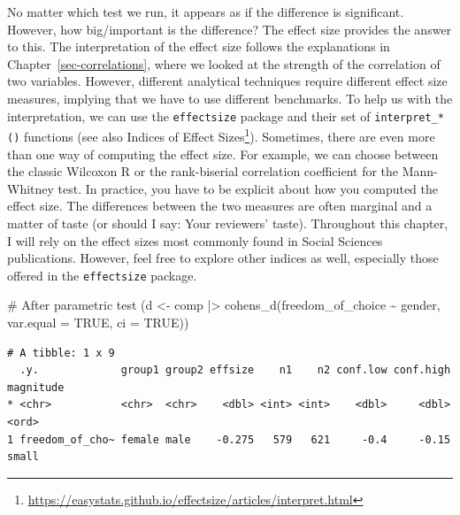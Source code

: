 \documentclass[
  letterpaper,
]{krantz}
\makeatletter
\newenvironment{Shaded}{\begin{snugshade}}{\end{snugshade}}
\newcommand{\AttributeTok}[1]{\textcolor[rgb]{0.40,0.45,0.13}{#1}}
\newcommand{\CommentTok}[1]{\textcolor[rgb]{0.37,0.37,0.37}{#1}}
\newcommand{\ConstantTok}[1]{\textcolor[rgb]{0.56,0.35,0.01}{#1}}
\newcommand{\FunctionTok}[1]{\textcolor[rgb]{0.28,0.35,0.67}{#1}}
\newcommand{\NormalTok}[1]{\textcolor[rgb]{0.00,0.23,0.31}{#1}}
\newcommand{\OtherTok}[1]{\textcolor[rgb]{0.00,0.23,0.31}{#1}}
\newcommand{\SpecialCharTok}[1]{\textcolor[rgb]{0.37,0.37,0.37}{#1}}
\renewcommand{\href}[2]{#2\footnote{\url{#1}}}
\newenvironment{kframe}{%
\medskip{}
\setlength{\fboxsep}{.8em}
 \def\at@end@of@kframe{}%
 \ifinner\ifhmode%
  \def\at@end@of@kframe{\end{minipage}}%
  \begin{minipage}{\columnwidth}%
 \fi\fi%
 \def\FrameCommand##1{\hskip\@totalleftmargin \hskip-\fboxsep
 \colorbox{shadecolor}{##1}\hskip-\fboxsep
     \hskip-\linewidth \hskip-\@totalleftmargin \hskip\columnwidth}%
 \MakeFramed {\advance\hsize-\width
   \@totalleftmargin\z@ \linewidth\hsize
   \@setminipage}}%
 {\par\unskip\endMakeFramed%
 \at@end@of@kframe}
\renewenvironment{Shaded}{\begin{kframe}}{\end{kframe}}
\makeatother
\begin{document}
No matter which test we run, it appears as if the difference is
significant. However, how big/important is the difference? The effect
size provides the answer to this. The interpretation of the effect size
follows the explanations in Chapter~\ref{sec-correlations}, where we
looked at the strength of the correlation of two variables. However,
different analytical techniques require different effect size measures,
implying that we have to use different benchmarks. To help us with the
interpretation, we can use the \texttt{effectsize} package and their set
of \texttt{interpret\_*()} functions (see also
\href{https://easystats.github.io/effectsize/articles/interpret.html}{Indices
of Effect Sizes}). Sometimes, there are even more than one way of
computing the effect size. For example, we can choose between the
classic Wilcoxon R or the rank-biserial correlation coefficient for the
Mann-Whitney test. In practice, you have to be explicit about how you
computed the effect size. The differences between the two measures are
often marginal and a matter of taste (or should I say: Your reviewers'
taste). Throughout this chapter, I will rely on the effect sizes most
commonly found in Social Sciences publications. However, feel free to
explore other indices as well, especially those offered in the
\texttt{effectsize} package.

\begin{Shaded}
\begin{Highlighting}[]
\CommentTok{\# After parametric test}
\NormalTok{(d }\OtherTok{\textless{}{-}}
\NormalTok{    comp }\SpecialCharTok{|\textgreater{}}
    \FunctionTok{cohens\_d}\NormalTok{(freedom\_of\_choice }\SpecialCharTok{\textasciitilde{}}\NormalTok{ gender,}
             \AttributeTok{var.equal =} \ConstantTok{TRUE}\NormalTok{,}
             \AttributeTok{ci =} \ConstantTok{TRUE}\NormalTok{))}
\end{Highlighting}
\end{Shaded}

\begin{verbatim}
# A tibble: 1 x 9
  .y.             group1 group2 effsize    n1    n2 conf.low conf.high magnitude
* <chr>           <chr>  <chr>    <dbl> <int> <int>    <dbl>     <dbl> <ord>    
1 freedom_of_cho~ female male    -0.275   579   621     -0.4     -0.15 small    
\end{verbatim}

\begin{Shaded}
\end{Shaded}
\end{document}
